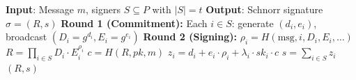 \begin{algorithm}[t]
\caption{FROST Threshold Signing on Zoo}
\label{alg:frost}
\begin{algorithmic}[1]
\STATE \textbf{Input}: Message $m$, signers $S \subseteq P$ with $|S| = t$
\STATE \textbf{Output}: Schnorr signature $\sigma = (R, s)$
\STATE \textbf{Round 1 (Commitment):}
\STATE Each $i \in S$: generate $(d_i, e_i)$, broadcast $(D_i = g^{d_i}, E_i = g^{e_i})$
\STATE \textbf{Round 2 (Signing):}
\STATE $\rho_i = H(\text{msg}, i, D_i, E_i, \ldots)$
\STATE $R = \prod_{i \in S} D_i \cdot E_i^{\rho_i}$
\STATE $c = H(R, pk, m)$
\STATE $z_i = d_i + e_i \cdot \rho_i + \lambda_i \cdot sk_i \cdot c$
\STATE $s = \sum_{i \in S} z_i$
\RETURN $(R, s)$
\end{algorithmic}
\end{algorithm}

